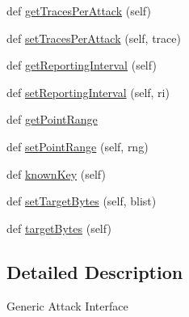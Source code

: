 \begin{DoxyCompactItemize}
def \hyperlink{classsoftware_1_1chipwhisperer_1_1analyzer_1_1attacks_1_1__base_1_1AttackBaseClass_a784c0d1d63a755a45419e6f3843ccf4a}{get\+Traces\+Per\+Attack} (self)
\item 
def \hyperlink{classsoftware_1_1chipwhisperer_1_1analyzer_1_1attacks_1_1__base_1_1AttackBaseClass_acdc9e2383ed4f25a0032aea23d2c0a9e}{set\+Traces\+Per\+Attack} (self, trace)
\item 
def \hyperlink{classsoftware_1_1chipwhisperer_1_1analyzer_1_1attacks_1_1__base_1_1AttackBaseClass_acda4f84c860f9f69b615502284b95cfc}{get\+Reporting\+Interval} (self)
\item 
def \hyperlink{classsoftware_1_1chipwhisperer_1_1analyzer_1_1attacks_1_1__base_1_1AttackBaseClass_ac7ae6ec59d30f193316e3abae91fda56}{set\+Reporting\+Interval} (self, ri)
\item 
def \hyperlink{classsoftware_1_1chipwhisperer_1_1analyzer_1_1attacks_1_1__base_1_1AttackBaseClass_a89bcee480d7348f3a44ce6ad036e525f}{get\+Point\+Range}
\item 
def \hyperlink{classsoftware_1_1chipwhisperer_1_1analyzer_1_1attacks_1_1__base_1_1AttackBaseClass_afde39cac97f02935e847b519ffdd87fe}{set\+Point\+Range} (self, rng)
\item 
def \hyperlink{classsoftware_1_1chipwhisperer_1_1analyzer_1_1attacks_1_1__base_1_1AttackBaseClass_a913d0c163f0d84448243fa534128a59c}{known\+Key} (self)
\item 
def \hyperlink{classsoftware_1_1chipwhisperer_1_1analyzer_1_1attacks_1_1__base_1_1AttackBaseClass_a69c24e733223e1722b1a3765a2ef6da0}{set\+Target\+Bytes} (self, blist)
\item 
def \hyperlink{classsoftware_1_1chipwhisperer_1_1analyzer_1_1attacks_1_1__base_1_1AttackBaseClass_a4a2cf47b7d50724c9c6c48327fc12e7a}{target\+Bytes} (self)
\end{DoxyCompactItemize}


\subsection{Detailed Description}
\begin{DoxyVerb}Generic Attack Interface\end{DoxyVerb}
 

